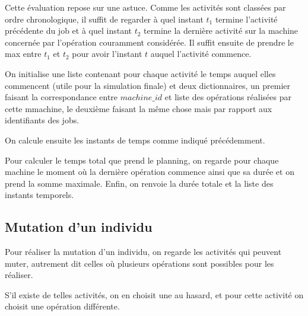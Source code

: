 Cette évaluation repose sur une astuce. Comme les activités sont classées par ordre chronologique, il suffit de regarder à quel instant $t_1$ termine l'activité précédente du job et à quel instant $t_2$ termine la dernière activité sur la machine concernée par l'opération couramment considérée. Il suffit ensuite de prendre le max entre $t_1$ et $t_2$ pour avoir l'instant $t$ auquel l'activité commence.

\newpage



On initialise une liste contenant pour chaque activité le temps auquel elles commencent (utile pour la simulation finale) et deux dictionnaires, un premier faisant la correspondance entre $machine\_id$ et liste des opérations réalisées par cette mmachine, le deuxième faisant la même chose mais par rapport aux identifiants des jobs.



On calcule ensuite les instants de temps comme indiqué précédemment.

\newpage



Pour calculer le temps total que prend le planning, on regarde pour chaque machine le moment où la dernière opération commence ainsi que sa durée et on prend la somme maximale. Enfin, on renvoie la durée totale et la liste des instants temporels.

\subsection{Mutation d'un individu}



Pour réaliser la mutation d'un individu, on regarde les activités qui peuvent muter, autrement dit celles où plusieurs opérations sont possibles pour les réaliser.



S'il existe de telles activités, on en choisit une au hasard, et pour cette activité on choisit une opération différente. 



